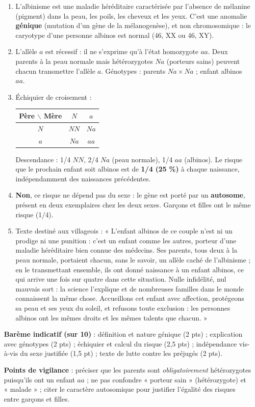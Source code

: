 \documentclass[11pt]{article}
\begin{document}
\begin{corrige}
\begin{enumerate}
\item L'albinisme est une maladie héréditaire caractérisée par l'absence de mélanine (pigment) dans la peau, les poils, les cheveux et les yeux. C'est une anomalie \textbf{génique} (mutation d'un gène de la mélanogenèse), et non chromosomique : le caryotype d'une personne albinos est normal (46, XX ou 46, XY).
\item L'allèle $a$ est récessif : il ne s'exprime qu'à l'état homozygote $aa$. Deux parents à la peau normale mais hétérozygotes $Na$ (porteurs sains) peuvent chacun transmettre l'allèle $a$. Génotypes : parents $Na \times Na$ ; enfant albinos $aa$.
\item Échiquier de croisement :
\begin{center}
\begin{tabular}{|c|c|c|}
\hline
\rowcolor{popblueL} Père $\backslash$ Mère & $N$ & $a$ \\
\hline
$N$ & $NN$ & $Na$ \\
\hline
$a$ & $Na$ & $aa$ \\
\hline
\end{tabular}
\end{center}
Descendance : 1/4 $NN$, 2/4 $Na$ (peau normale), 1/4 $aa$ (albinos). Le risque que le prochain enfant soit albinos est de \textbf{1/4 (25 \%)} à chaque naissance, indépendamment des naissances précédentes.
\item \textbf{Non}, ce risque ne dépend pas du sexe : le gène est porté par un \textbf{autosome}, présent en deux exemplaires chez les deux sexes. Garçons et filles ont le même risque (1/4).
\item Texte destiné aux villageois : « L'enfant albinos de ce couple n'est ni un prodige ni une punition : c'est un enfant comme les autres, porteur d'une maladie héréditaire bien connue des médecins. Ses parents, tous deux à la peau normale, portaient chacun, sans le savoir, un allèle caché de l'albinisme ; en le transmettant ensemble, ils ont donné naissance à un enfant albinos, ce qui arrive une fois sur quatre dans cette situation. Nulle infidélité, nul mauvais sort : la science l'explique et de nombreuses familles dans le monde connaissent la même chose. Accueillons cet enfant avec affection, protégeons sa peau et ses yeux du soleil, et refusons toute exclusion : les personnes albinos ont les mêmes droits et les mêmes talents que chacun. »
\end{enumerate}
\textbf{Barème indicatif (sur 10)} : définition et nature génique (2 pts) ; explication avec génotypes (2 pts) ; échiquier et calcul du risque (2,5 pts) ; indépendance vis-à-vis du sexe justifiée (1,5 pt) ; texte de lutte contre les préjugés (2 pts).

\textbf{Points de vigilance} : préciser que les parents sont \emph{obligatoirement} hétérozygotes puisqu'ils ont un enfant $aa$ ; ne pas confondre « porteur sain » (hétérozygote) et « malade » ; citer le caractère autosomique pour justifier l'égalité des risques entre garçons et filles.
\end{corrige}
\end{document}
